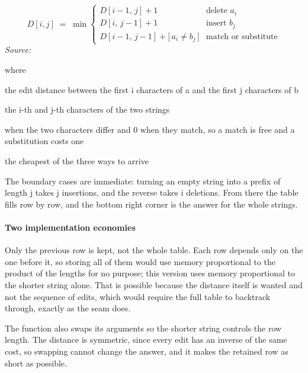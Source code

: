 \begin{equation}
D[i,j] \;=\; \min \begin{cases} D[i-1,\,j] + 1 & \text{delete } a_i \\ D[i,\,j-1] + 1 & \text{insert } b_j \\ D[i-1,\,j-1] + \big[\,a_i \neq b_j\,\big] & \text{match or substitute} \end{cases}
\end{equation}
\noindent\emph{Source: }\cite{levenshtein1966}


\noindent where
\begin{description}[leftmargin=2.4em,style=nextline,font=\normalfont\ttfamily]\setlength\itemsep{1pt}
  \item[{$D[i,j]$}] \normalfont the edit distance between the first i characters of a and the first j characters of b
  \item[{$a_i,\, b_j$}] \normalfont the i-th and j-th characters of the two strings
  \item[{$[\,a_i \neq b_j\,]$}]  when the two characters differ and 0 when they match, so a match is free and a substitution costs one
  \item[{$\min$}] \normalfont the cheapest of the three ways to arrive
\end{description}
The boundary cases are immediate: turning an empty string into a prefix of length j takes j insertions, and the reverse takes i deletions. From there the table fills row by row, and the bottom right corner is the answer for the whole strings.


\paragraph{Two implementation economies}
Only the previous row is kept, not the whole table. Each row depends only on the one before it, so storing all of them would use memory proportional to the product of the lengths for no purpose; this version uses memory proportional to the shorter string alone. That is possible because the distance itself is wanted and not the sequence of edits, which would require the full table to backtrack through, exactly as the seam does.

The function also swaps its arguments so the shorter string controls the row length. The distance is symmetric, since every edit has an inverse of the same cost, so swapping cannot change the answer, and it makes the retained row as short as possible.


